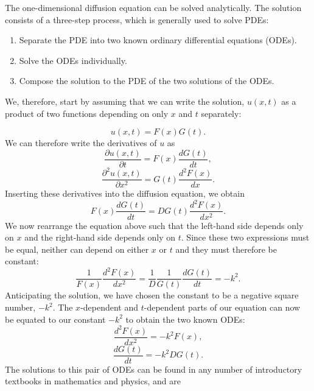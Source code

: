 \documentclass[a4paper, 
amsfonts, 
amssymb, 
amsmath, 
reprint, 
showkeys, 
nofootinbib, 
twoside]{revtex4-2}
\begin{document}
The one-dimensional diffusion equation can be solved analytically. The solution consists of a three-step process, which is generally used to solve PDEs:
\begin{enumerate}
    \item Separate the PDE into two known ordinary differential equations (ODEs).
    \item Solve the ODEs individually.
    \item Compose the solution to the PDE of the two solutions of the ODEs.
\end{enumerate}

We, therefore, start by assuming that we can write the solution, $u(x,t)$ as a product of two functions depending on only $x$ and $t$ separately:

\begin{equation}
    u(x, t) = F(x) G(t).
\end{equation}
We can therefore write the derivatives of $u$ as
\begin{equation}
    \frac{\partial u(x, t)}{\partial t} = F(x) \frac{ d G(t)}{dt},
\end{equation}
\begin{equation}
    \frac{\partial^2 u(x, t)}{\partial x^2} = G(t) \frac{ d^2 F(x)}{dx}.
\end{equation}
Inserting these derivatives into the diffusion equation, we obtain
\begin{equation}
    F(x) \frac{ d G(t)}{dt} = D G(t) \frac{ d^2 F(x)}{dx^2}.
\end{equation}
We now rearrange the equation above such that the left-hand side depends only on $x$ and the right-hand side depends only on $t$. Since these two expressions must be equal, neither can depend on either $x$ or $t$ and they must therefore be constant:
\begin{equation}
    \frac{1}{F(x)}\frac{ d^2 F(x)}{dx^2} = \frac{1}{D}\frac{1}{G(t)}  \frac{ d G(t)}{dt} = -k^2.
\end{equation}
Anticipating the solution, we have chosen the constant to be a negative square number, $-k^2$.  
The $x$-dependent and $t$-dependent parts of our equation can now be equated to our constant $-k^2$ to obtain the two known ODEs:
\begin{equation}
    \frac{ d^2 F(x)}{dx^2} = -k^2 F(x),
\end{equation}
\begin{equation}
     \frac{ d G(t)}{dt} = -k^2 D G(t).
\end{equation}
The solutions to this pair of ODEs can be found in any number of introductory textbooks in mathematics and physics, and are
\end{document}
